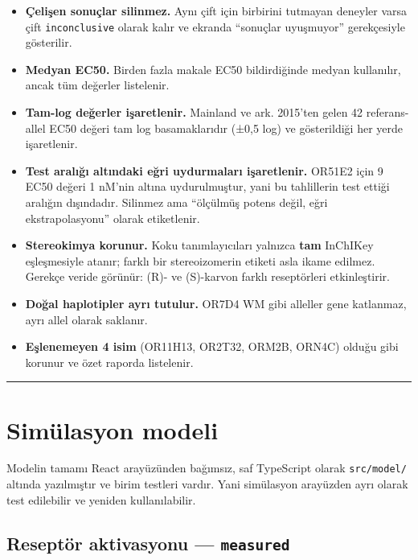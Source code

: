 \documentclass[11pt,a4paper]{article}
\begin{document}
\begin{itemize}
\item \textbf{Çelişen sonuçlar silinmez.} Aynı çift için birbirini tutmayan deneyler varsa çift
\texttt{\small inconclusive} olarak kalır ve ekranda ``sonuçlar uyuşmuyor'' gerekçesiyle gösterilir.

\item \textbf{Medyan EC50.} Birden fazla makale EC50 bildirdiğinde medyan kullanılır, ancak tüm değerler listelenir.
\item \textbf{Tam-log değerler işaretlenir.} Mainland ve ark. 2015'ten gelen 42 referans-allel EC50 değeri tam log basamaklarıdır (±0,5 log) ve gösterildiği her yerde işaretlenir.
\item \textbf{Test aralığı altındaki eğri uydurmaları işaretlenir.} OR51E2 için 9 EC50 değeri 1 nM'nin altına uydurulmuştur, yani bu tahlillerin test ettiği aralığın dışındadır. Silinmez ama ``ölçülmüş potens değil, eğri ekstrapolasyonu'' olarak etiketlenir.
\item \textbf{Stereokimya korunur.} Koku tanımlayıcıları yalnızca \textbf{tam} InChIKey eşleşmesiyle atanır; farklı bir stereoizomerin etiketi asla ikame edilmez. Gerekçe veride görünür: (R)- ve (S)-karvon farklı reseptörleri etkinleştirir.
\item \textbf{Doğal haplotipler ayrı tutulur.} OR7D4 WM gibi alleller gene katlanmaz, ayrı allel olarak saklanır.
\item \textbf{Eşlenemeyen 4 isim} (OR11H13, OR2T32, ORM2B, ORN4C) olduğu gibi korunur ve özet raporda listelenir.
\end{itemize}


\vspace{0.4\baselineskip}
\hrule
\vspace{0.9\baselineskip}


\section{Simülasyon modeli}

Modelin tamamı React arayüzünden bağımsız, saf TypeScript olarak \texttt{\small src/model/} altında yazılmıştır ve birim testleri vardır. Yani simülasyon arayüzden ayrı olarak test edilebilir ve yeniden kullanılabilir.


\subsection{Reseptör aktivasyonu — \texttt{\small measured}}
\end{document}

